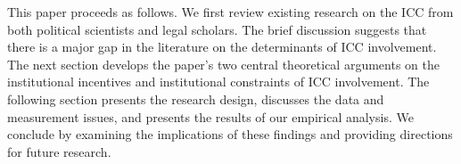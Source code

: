 This paper proceeds as follows.  We first review existing research on the ICC from both political scientists and legal scholars.  The brief discussion suggests that there is a major gap in the literature on the determinants of ICC involvement. The next section develops the paper’s two central theoretical arguments on the institutional incentives and institutional constraints of ICC involvement.  The following section presents the research design, discusses the data and measurement issues, and presents the results of our empirical analysis.  We conclude by examining the implications of these findings and providing directions for future research.
